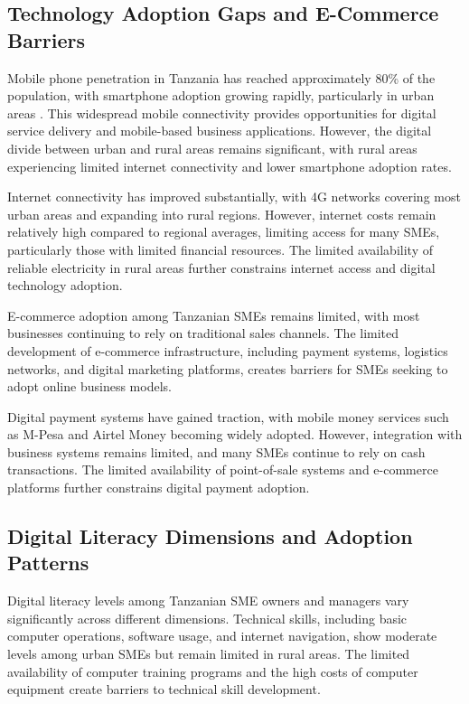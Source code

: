\documentclass[12pt,a4paper]{article}
\begin{document}
\subsection{Technology Adoption Gaps and E-Commerce Barriers}

Mobile phone penetration in Tanzania has reached approximately 80\% of the population, with smartphone adoption growing rapidly, particularly in urban areas \cite{tcra2023mobile}. This widespread mobile connectivity provides opportunities for digital service delivery and mobile-based business applications. However, the digital divide between urban and rural areas remains significant, with rural areas experiencing limited internet connectivity and lower smartphone adoption rates.

Internet connectivity has improved substantially, with 4G networks covering most urban areas and expanding into rural regions. However, internet costs remain relatively high compared to regional averages, limiting access for many SMEs, particularly those with limited financial resources. The limited availability of reliable electricity in rural areas further constrains internet access and digital technology adoption.

E-commerce adoption among Tanzanian SMEs remains limited, with most businesses continuing to rely on traditional sales channels. The limited development of e-commerce infrastructure, including payment systems, logistics networks, and digital marketing platforms, creates barriers for SMEs seeking to adopt online business models.

Digital payment systems have gained traction, with mobile money services such as M-Pesa and Airtel Money becoming widely adopted. However, integration with business systems remains limited, and many SMEs continue to rely on cash transactions. The limited availability of point-of-sale systems and e-commerce platforms further constrains digital payment adoption.

\subsection{Digital Literacy Dimensions and Adoption Patterns}

Digital literacy levels among Tanzanian SME owners and managers vary significantly across different dimensions. Technical skills, including basic computer operations, software usage, and internet navigation, show moderate levels among urban SMEs but remain limited in rural areas. The limited availability of computer training programs and the high costs of computer equipment create barriers to technical skill development.
\end{document}
